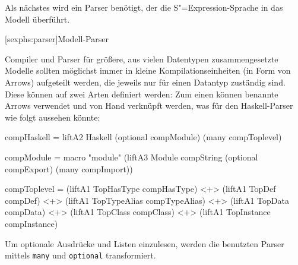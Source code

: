 \documentclass[11pt, a4paper, bibgerm]{scrbook}
\newcommand\icode[1]{\lstinline?#1?}
\newcommand\lsection{}
\newcommand{\sexp}{S"=Expression}
\begin{document}
Als nächstes wird ein Parser benötigt, der die \sexp{}-Sprache in das
Modell überführt.

\lsection[sexphs:parser]{Modell-Parser}

Compiler und Parser für größere, aus vielen Datentypen zusammengesetzte Modelle
sollten möglichst immer in kleine Kompilationseinheiten (in Form von
Arrows) aufgeteilt werden, die jeweils nur für einen Datantyp zuständig
sind. Diese können auf zwei Arten definiert werden: Zum einen können
benannte Arrows verwendet und von Hand verknüpft werden, was für den
Haskell-Parser wie folgt aussehen könnte:
\begin{code}
compHaskell = liftA2 Haskell (optional compModule) (many compToplevel)

compModule = macro "module" (liftA3 Module
                                    compString
                                    (optional compExport)
                                    (many compImport))

compToplevel = (liftA1 TopHasType   compHasType)   <+>
               (liftA1 TopDef       compDef)       <+>
               (liftA1 TopTypeAlias compTypeAlias) <+>
               (liftA1 TopData      compData)      <+>
               (liftA1 TopClass     compClass)     <+>
               (liftA1 TopInstance  compInstance)
\end{code}
Um optionale Ausdrücke und Listen einzulesen, werden die benutzten Parser
mittels \icode{many} und \icode{optional} transformiert.
\end{document}
